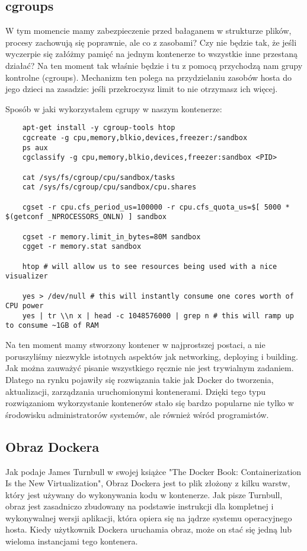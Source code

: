 \subsection{cgroups}
W tym momencie mamy zabezpieczenie przed bałaganem w strukturze plików, procesy zachowują się poprawnie, ale co z zasobami? Czy nie będzie tak, że jeśli wyczerpie się załóżmy pamięć na jednym kontenerze to wszystkie inne przestaną działać? Na ten moment tak właśnie będzie i tu z pomocą przychodzą nam grupy kontrolne (cgroups). Mechanizm ten polega na przydzielaniu zasobów hosta do jego dzieci na zasadzie: jeśli przekroczysz limit to nie otrzymasz ich więcej. 

Sposób w jaki wykorzystałem cgrupy w naszym kontenerze: 

\begin{lstlisting}
    apt-get install -y cgroup-tools htop
    cgcreate -g cpu,memory,blkio,devices,freezer:/sandbox
    ps aux 
    cgclassify -g cpu,memory,blkio,devices,freezer:sandbox <PID>

    cat /sys/fs/cgroup/cpu/sandbox/tasks
    cat /sys/fs/cgroup/cpu/sandbox/cpu.shares

    cgset -r cpu.cfs_period_us=100000 -r cpu.cfs_quota_us=$[ 5000 * $(getconf _NPROCESSORS_ONLN) ] sandbox

    cgset -r memory.limit_in_bytes=80M sandbox
    cgget -r memory.stat sandbox

    htop # will allow us to see resources being used with a nice visualizer

    yes > /dev/null # this will instantly consume one cores worth of CPU power
    yes | tr \\n x | head -c 1048576000 | grep n # this will ramp up to consume ~1GB of RAM
\end{lstlisting}
Na ten moment mamy stworzony kontener w najprostszej postaci, a nie poruszyliśmy niezwykle istotnych aspektów jak networking, deploying i building. 
Jak można zauważyć pisanie wszystkiego ręcznie nie jest trywialnym zadaniem. Dlatego na rynku pojawiły się rozwiązania takie jak Docker do tworzenia, aktualizacji, zarządzania uruchomionymi kontenerami. Dzięki tego typu rozwiązaniom wykorzystanie kontenerów stało się bardzo popularne nie tylko w środowisku administratorów systemów, ale również wśród programistów. 
\subsection{Obraz Dockera}
Jak podaje James Turnbull w swojej książce "The Docker Book: Containerization Is the New Virtualization"\cite{Docker}, Obraz Dockera jest to plik złożony z kilku warstw, który jest używany do wykonywania kodu w kontenerze. Jak pisze Turnbull, obraz jest zasadniczo zbudowany na podstawie instrukcji dla kompletnej i wykonywalnej wersji aplikacji, która opiera się na jądrze systemu operacyjnego hosta. Kiedy użytkownik Dockera uruchamia obraz, może on stać się jedną lub wieloma instancjami tego kontenera.
